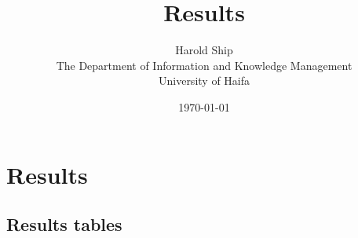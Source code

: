 \documentclass[12pt,a4paper,twoside]{book}
\title{Results}
\author{
        Harold Ship \\
                The Department of Information and Knowledge Management \\
        University of Haifa
}
\date{\today}
\begin{document}
\maketitle

\pagestyle{plain}

\chapter{Results}


\begin{appendices}
\chapter{Results tables}

\end{appendices}



\end{document}
